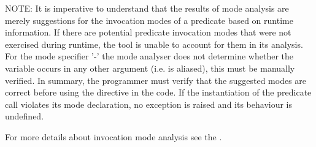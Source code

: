 NOTE: It is imperative to understand that the results of mode analysis
are merely suggestions for the invocation modes of a predicate based on
runtime information. If there are potential predicate invocation modes
that were not exercised during runtime, the tool is unable to account
for them in its analysis. For the mode specifier '-' the mode analyser
does not determine whether the variable occurs in any other argument
(i.e. is aliased), this must be manually verified.
In summary, the programmer must verify that the suggested modes are correct
before using the directive in the code.  If the instantiation of the
predicate call violates its mode declaration, no exception is raised and
its behaviour is undefined.

For more details about invocation mode analysis see 
the .

